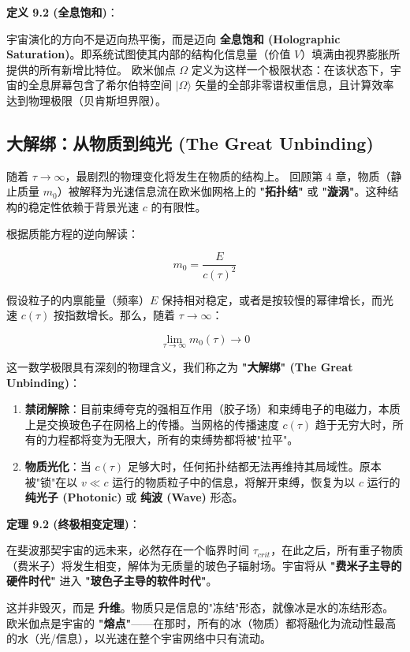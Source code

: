 \textbf{定义 9.2 (全息饱和)}：

宇宙演化的方向不是迈向热平衡，而是迈向 \textbf{全息饱和 (Holographic Saturation)}。即系统试图使其内部的结构化信息量（价值 $V$）填满由视界膨胀所提供的所有新增比特位。
欧米伽点 $\Omega$ 定义为这样一个极限状态：在该状态下，宇宙的全息屏幕包含了希尔伯特空间 $|\Omega\rangle$ 矢量的全部非零谱权重信息，且计算效率达到物理极限（贝肯斯坦界限）。

\subsection{大解绑：从物质到纯光 (The Great Unbinding)}

随着 $\tau \to \infty$，最剧烈的物理变化将发生在物质的结构上。
回顾第 4 章，物质（静止质量 $m_0$）被解释为光速信息流在欧米伽网格上的 \textbf{"拓扑结"} 或 \textbf{"漩涡"}。这种结构的稳定性依赖于背景光速 $c$ 的有限性。

根据质能方程的逆向解读：

\[m_0 = \frac{E}{c(\tau)^2}\]

假设粒子的内禀能量（频率）$E$ 保持相对稳定，或者是按较慢的幂律增长，而光速 $c(\tau)$ 按指数增长。那么，随着 $\tau \to \infty$：

\[\lim_{\tau \to \infty} m_0(\tau) \to 0\]

这一数学极限具有深刻的物理含义，我们称之为 \textbf{"大解绑" (The Great Unbinding)}：

\begin{enumerate}
\item \textbf{禁闭解除}：目前束缚夸克的强相互作用（胶子场）和束缚电子的电磁力，本质上是交换玻色子在网格上的传播。当网格的传播速度 $c(\tau)$ 趋于无穷大时，所有的力程都将变为无限大，所有的束缚势都将被"拉平"。
\item \textbf{物质光化}：当 $c(\tau)$ 足够大时，任何拓扑结都无法再维持其局域性。原本被"锁"在以 $v \ll c$ 运行的物质粒子中的信息，将解开束缚，恢复为以 $c$ 运行的 \textbf{纯光子 (Photonic)} 或 \textbf{纯波 (Wave)} 形态。
\end{enumerate}

\textbf{定理 9.2 (终极相变定理)}：

在斐波那契宇宙的远未来，必然存在一个临界时间 $\tau_{crit}$，在此之后，所有重子物质（费米子）将发生相变，解体为无质量的玻色子辐射场。宇宙将从 \textbf{"费米子主导的硬件时代"} 进入 \textbf{"玻色子主导的软件时代"}。

这并非毁灭，而是 \textbf{升维}。物质只是信息的"冻结"形态，就像冰是水的冻结形态。欧米伽点是宇宙的 \textbf{"熔点"}——在那时，所有的冰（物质）都将融化为流动性最高的水（光/信息），以光速在整个宇宙网络中只有流动。

